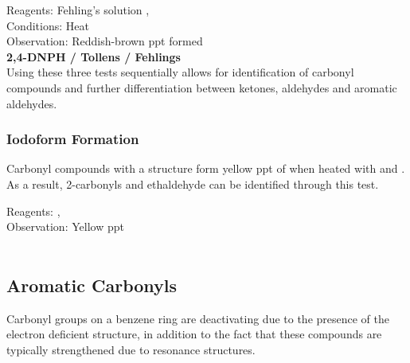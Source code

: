 \documentclass[../main]{subfiles}
\begin{document}
	Reagents: Fehling's solution ,  \\
	Conditions: Heat \\
	Observation: Reddish-brown ppt formed \\

	\noindent \textbf{2,4-DNPH / Tollens / Fehlings} \\

	Using these three tests sequentially allows for identification of carbonyl compounds and further differentiation between ketones, aldehydes and aromatic aldehydes. \\

	\subsubsection{Iodoform Formation}

	Carbonyl compounds with a  structure form yellow ppt of  when heated with  and . As a result, 2-carbonyls and ethaldehyde can be identified through this test.

	Reagents: ,  \\
	Observation: Yellow ppt  \\

	 \\

	\subsection{Aromatic Carbonyls}

	Carbonyl groups on a benzene ring are deactivating due to the presence of the electron deficient  structure, in addition to the fact that these compounds are typically strengthened due to resonance structures. \\

	
\end{document}

